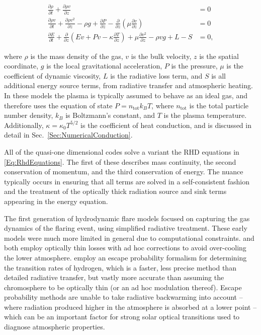 \begin{equation}
    \begin{aligned}
    \frac{\partial \rho}{\partial t} + \frac{\partial \rho v}{\partial z} &= 0\\
    \frac{\partial \rho v}{\partial t} + \frac{\partial \rho v^2}{\partial z} - \rho g + \frac{\partial P}{\partial z} - \frac{\partial}{\partial z}\left(\mu \frac{\partial v}{\partial z}\right) &= 0\\
    \frac{\partial E}{\partial t} + \frac{\partial}{\partial z}\left( Ev + Pv - \kappa\frac{\partial T}{\partial z} \right)+ \mu\frac{\partial v^2}{\partial z} -\rho v g + L - S &= 0,
    \end{aligned}\label{Eq:RhdEquations}
\end{equation}

where $\rho$ is the mass density of the gas, $v$ is the bulk velocity, $z$ is the spatial coordinate, $g$ is the local gravitational acceleration, $P$ is the pressure, $\mu$ is the coefficient of dynamic viscosity, $L$ is the radiative loss term, and $S$ is all additional energy source terms, from radiative transfer and atmospheric heating.
In these models the plasma is typically assumed to behave as an ideal gas, and therefore uses the equation of state
$P = n_{\mathrm{tot}} k_B T$, where $n_{\mathrm{tot}}$ is the total particle number density, $k_B$ is Boltzmann's constant, and $T$ is the plasma temperature. Additionally, $\kappa=\kappa_0 T^{5/2}$ is the coefficient of heat conduction, and is discussed in detail in Sec.~\ref{Sec:NumericalConduction}.

All of the quasi-one dimensional codes solve a variant the RHD equations in \eqref{Eq:RhdEquations}. The first of these describes mass continuity, the second conservation of momentum, and the third conservation of energy.
The nuance typically occurs in ensuring that all terms are solved in a self-consistent fashion and the treatment of the optically thick radiation source and sink terms appearing in the energy equation.

The first generation of hydrodynamic flare models \citet{Nagai1980,Mariska1982,McClymont1983} focused on capturing the gas dynamics of the flaring event, using simplified radiative treatment.
These early models were much more limited in general due to computational constraints. \citet{Nagai1980} and \citet{Mariska1982} both employ optically thin losses with ad hoc corrections to avoid over-cooling the lower atmosphere.
\citet{McClymont1983} employ an escape probability formalism for determining the transition rates of hydrogen, which is a faster, less precise method than detailed radiative transfer, but vastly more accurate than assuming the chromosphere to be optically thin (or an ad hoc modulation thereof).
Escape probability methods are unable to take radiative backwarming into account -- where radiation produced higher in the atmosphere is absorbed at a lower point -- which can be an important factor for strong solar optical transitions used to diagnose atmospheric properties.

